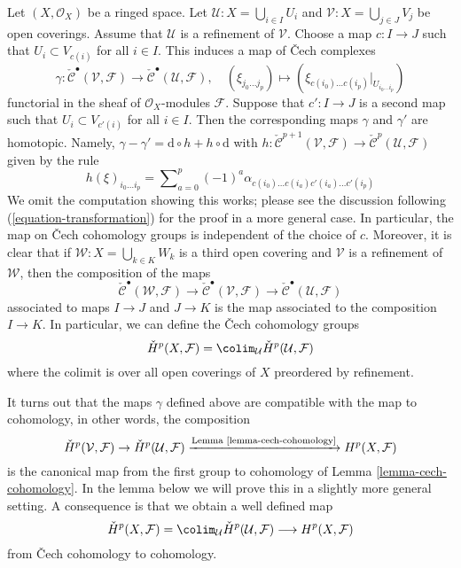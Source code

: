 \noindent
Let $(X, \mathcal{O}_X)$ be a ringed space. Let
$\mathcal{U} : X = \bigcup_{i \in I} U_i$ and
$\mathcal{V} : X = \bigcup_{j \in J} V_j$ be open coverings.
Assume that $\mathcal{U}$ is a refinement of $\mathcal{V}$.
Choose a map $c : I \to J$ such that $U_i \subset V_{c(i)}$
for all $i \in I$. This induces a map of {\v C}ech complexes
$$
\gamma :
\check{\mathcal{C}}^\bullet(\mathcal{V}, \mathcal{F})
\longrightarrow
\check{\mathcal{C}}^\bullet(\mathcal{U}, \mathcal{F}),
\quad
(\xi_{j_0 \ldots j_p})
\longmapsto
(\xi_{c(i_0) \ldots c(i_p)}|_{U_{i_0 \ldots i_p}})
$$
functorial in the sheaf of $\mathcal{O}_X$-modules $\mathcal{F}$.
Suppose that $c' : I \to J$ is a second map such that
$U_i \subset V_{c'(i)}$ for all $i \in I$. Then the corresponding maps
$\gamma$ and $\gamma'$ are homotopic. Namely,
$\gamma - \gamma' = \text{d} \circ h + h \circ \text{d}$
with
$h : \check{\mathcal{C}}^{p + 1}(\mathcal{V}, \mathcal{F}) \to
\check{\mathcal{C}}^p(\mathcal{U}, \mathcal{F})$
given by the rule
$$
h(\xi)_{i_0 \ldots i_p} =
\sum\nolimits_{a = 0}^{p}
(-1)^a
\alpha_{c(i_0)\ldots c(i_a) c'(i_a) \ldots c'(i_p)}
$$
We omit the computation showing this works; please see the discussion
following (\ref{equation-transformation}) for the proof in a more general
case. In particular, the map on {\v C}ech cohomology groups is independent
of the choice of $c$. Moreover, it is clear that if
$\mathcal{W} : X = \bigcup_{k \in K} W_k$ is a third open covering
and $\mathcal{V}$ is a refinement of $\mathcal{W}$, then the composition
of the maps
$$
\check{\mathcal{C}}^\bullet(\mathcal{W}, \mathcal{F})
\longrightarrow
\check{\mathcal{C}}^\bullet(\mathcal{V}, \mathcal{F})
\longrightarrow
\check{\mathcal{C}}^\bullet(\mathcal{U}, \mathcal{F})
$$
associated to maps $I \to J$ and $J \to K$ is the map associated
to the composition $I \to K$.
In particular, we can define the {\v C}ech cohomology
groups
$$
\check{H}^p(X, \mathcal{F}) =
\colim_\mathcal{U} \check{H}^p(\mathcal{U}, \mathcal{F})
$$
where the colimit is over all open coverings of $X$ preordered by refinement.

\medskip\noindent
It turns out that the maps $\gamma$ defined above are compatible with
the map to cohomology, in other words, the composition
$$
\check{H}^p(\mathcal{V}, \mathcal{F}) \to
\check{H}^p(\mathcal{U}, \mathcal{F})
\xrightarrow{\text{Lemma \ref{lemma-cech-cohomology}}}
H^p(X, \mathcal{F})
$$
is the canonical map from the first group to cohomology of
Lemma \ref{lemma-cech-cohomology}. 
In the lemma below we will prove this in a slightly more general
setting. A consequence is that we obtain a well defined map
\begin{equation}
\label{equation-cech-to-cohomology}
\check{H}^p(X, \mathcal{F}) =
\colim_\mathcal{U} \check{H}^p(\mathcal{U}, \mathcal{F})
\longrightarrow
H^p(X, \mathcal{F})
\end{equation}
from {\v C}ech cohomology to cohomology.

